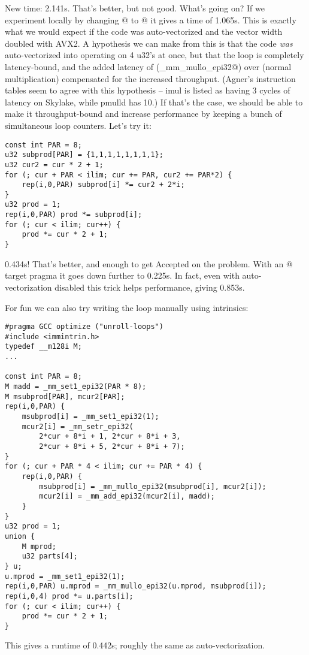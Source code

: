 New time: 2.141s. That's better, but not good. What's going on?
If we experiment locally by changing @ to @ it gives a time of 1.065s.
This is exactly what we would expect if the code was auto-vectorized and the vector width doubled with AVX2.
A hypothesis we can make from this is that the code \emph{was} auto-vectorized into operating on 4 u32's at once, but that the loop is completely latency-bound, and the added latency of \verb@pmulld@ (\verb@_mm_mullo_epi32@) over \verb@imul@ (normal multiplication) compensated for the increased throughput.
(Agner's instruction tables seem to agree with this hypothesis -- imul is listed as having 3 cycles of latency on Skylake, while pmulld has 10.)
If that's the case, we should be able to make it throughput-bound and increase performance by keeping a bunch of simultaneous loop counters.
Let's try it:

\begin{lstlisting}
const int PAR = 8;
u32 subprod[PAR] = {1,1,1,1,1,1,1,1};
u32 cur2 = cur * 2 + 1;
for (; cur + PAR < ilim; cur += PAR, cur2 += PAR*2) {
	rep(i,0,PAR) subprod[i] *= cur2 + 2*i;
}
u32 prod = 1;
rep(i,0,PAR) prod *= subprod[i];
for (; cur < ilim; cur++) {
	prod *= cur * 2 + 1;
}
\end{lstlisting}

0.434s! That's better, and enough to get Accepted on the problem.
With an @ target pragma it goes down further to 0.225s.
In fact, even with auto-vectorization disabled this trick helps performance, giving 0.853s.

For fun we can also try writing the loop manually using intrinsics:
\begin{lstlisting}
#pragma GCC optimize ("unroll-loops")
#include <immintrin.h>
typedef __m128i M;
...

const int PAR = 8;
M madd = _mm_set1_epi32(PAR * 8);
M msubprod[PAR], mcur2[PAR];
rep(i,0,PAR) {
	msubprod[i] = _mm_set1_epi32(1);
	mcur2[i] = _mm_setr_epi32(
	    2*cur + 8*i + 1, 2*cur + 8*i + 3,
	    2*cur + 8*i + 5, 2*cur + 8*i + 7);
}
for (; cur + PAR * 4 < ilim; cur += PAR * 4) {
	rep(i,0,PAR) {
		msubprod[i] = _mm_mullo_epi32(msubprod[i], mcur2[i]);
		mcur2[i] = _mm_add_epi32(mcur2[i], madd);
	}
}
u32 prod = 1;
union {
	M mprod;
	u32 parts[4];
} u;
u.mprod = _mm_set1_epi32(1);
rep(i,0,PAR) u.mprod = _mm_mullo_epi32(u.mprod, msubprod[i]);
rep(i,0,4) prod *= u.parts[i];
for (; cur < ilim; cur++) {
	prod *= cur * 2 + 1;
}
\end{lstlisting}

This gives a runtime of 0.442s; roughly the same as auto-vectorization.


